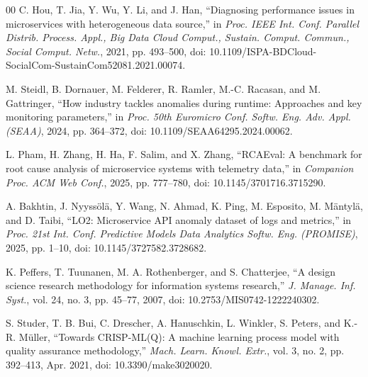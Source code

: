 \documentclass[conference]{IEEEtran}
\begin{document}
\begin{thebibliography}{00}
 C. Hou, T. Jia, Y. Wu, Y. Li, and J. Han, ``Diagnosing performance issues in microservices with heterogeneous data source,'' in \textit{Proc. IEEE Int. Conf. Parallel Distrib. Process. Appl., Big Data Cloud Comput., Sustain. Comput. Commun., Social Comput. Netw.}, 2021, pp. 493--500, doi: 10.1109/ISPA-BDCloud-SocialCom-SustainCom52081.2021.00074.

 M. Steidl, B. Dornauer, M. Felderer, R. Ramler, M.-C. Racasan, and M. Gattringer, ``How industry tackles anomalies during runtime: Approaches and key monitoring parameters,'' in \textit{Proc. 50th Euromicro Conf. Softw. Eng. Adv. Appl. (SEAA)}, 2024, pp. 364--372, doi: 10.1109/SEAA64295.2024.00062.

 L. Pham, H. Zhang, H. Ha, F. Salim, and X. Zhang, ``RCAEval: A benchmark for root cause analysis of microservice systems with telemetry data,'' in \textit{Companion Proc. ACM Web Conf.}, 2025, pp. 777--780, doi: 10.1145/3701716.3715290.

 A. Bakhtin, J. Nyyssölä, Y. Wang, N. Ahmad, K. Ping, M. Esposito, M. Mäntylä, and D. Taibi, ``LO2: Microservice API anomaly dataset of logs and metrics,'' in \textit{Proc. 21st Int. Conf. Predictive Models Data Analytics Softw. Eng. (PROMISE)}, 2025, pp. 1--10, doi: 10.1145/3727582.3728682.

 K. Peffers, T. Tuunanen, M. A. Rothenberger, and S. Chatterjee, ``A design science research methodology for information systems research,'' \textit{J. Manage. Inf. Syst.}, vol. 24, no. 3, pp. 45--77, 2007, doi: 10.2753/MIS0742-1222240302.

 S. Studer, T. B. Bui, C. Drescher, A. Hanuschkin, L. Winkler, S. Peters, and K.-R. Müller, ``Towards CRISP-ML(Q): A machine learning process model with quality assurance methodology,'' \textit{Mach. Learn. Knowl. Extr.}, vol. 3, no. 2, pp. 392--413, Apr. 2021, doi: 10.3390/make3020020.

\end{thebibliography}
\end{document}
